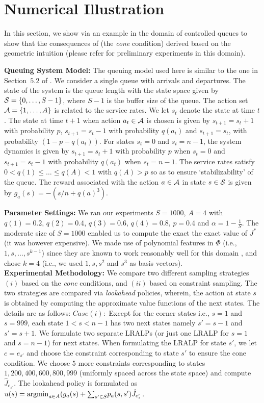 \section{Numerical Illustration}
In this section, we show via an example in the domain of controlled queues to show that the consequences of  (the \emph{cone} condition) derived based on the geometric intuition (please refer \cite{aaaipaper} for preliminary experiments in this domain).

\textbf{Queuing System Model:} The queuing model used here is similar to the one in Section~$5.2$ of \cite{ALP}. We consider a single queue with arrivals and departures. The state of the system is the queue length with the state space given by $\S=\{0,\ldots,S-1\}$, where $S-1$ is the buffer size of the queue. The action set $\A=\{1,\ldots,A\}$ is related to the service rates. We let $s_t$ denote the state at time $t$. The state at time $t+1$ when action $a_t \in \A $ is chosen is given by $s_{t+1}= s_{t}+1$ with probability $p$, $s_{t+1}= s_{t}-1$ with probability $q(a_t)$ and $s_{t+1}= s_t$, with probability $(1-p-q(a_t))$. For states $s_t=0$ and $s_t=n-1$, the system dynamics is given by $s_{t+1}= s_{t}+1$ with probability $p$ when $s_t=0$ and $s_{t+1}=s_t-1$ with probability $q(a_t)$ when $s_t=n-1$. The service rates satisfy $0<q(1)\leq \ldots\leq q(A)<1$ with $q(A)>p$ so as to ensure `stabilizability' of the queue. The reward associated with the action $a \in \A$ in state $s\in \S$ is given by $g_a(s)=-(s/n+q(a)^3)$.\par
\textbf{Parameter Settings:} We ran our experiments $S=1000$, $A=4$ with $q(1)=0.2$, $q(2)=0.4$, $q(3)=0.6$, $q(4)=0.8$, $p=0.4$ and $\alpha=1-\frac{1}{S}$.
The moderate size of $S=1000$ enabled us to compute the exact the exact value of $J^*$ (it was however expensive). We made use of polynomial features in $\Phi$ (i.e., $1,s,\ldots,s^{k-1}$) since they are known to work reasonably well for this domain \cite{ALP}, and chose $k=4$ (i.e., we used $1, s,s^2$ and $s^3$ as basis vectors).\\
\textbf{Experimental Methodology:} We compare two different sampling strategies $(i)$ based on the \emph{cone} conditions, and $(ii)$ based on constraint sampling. The two strategies are compared via  \emph{lookahead} policies, wherein, the action at state $s$ is obtained by computing the approximate value functions of the next states. The details are as follows:
$Case (i):$ Except for the corner states i.e., $s=1$ and $s=999$, each state $1<s<n-1$ has two next states namely $s'=s-1$ and $s'=s+1$. We formulate two separate LRALPs (or just one LRALP for $s=1$ and $s=n-1$) for next states. When formulating the LRALP for state $s'$, we let $c=e_{s'}$ and choose the constraint corresponding to state $s'$ to ensure the cone condition. We choose $5$ more constraints corresponding to states $1,200,400,600,800,999$ (uniformly spaced across the state space) and compute $\hat{J}_{e_{s'}}$. The lookahead policy is formulated as $u(s)={\argmin}_{a\in A}(g_a(s)+{\sum}_{s'\in S}p_a(s,s')\hat{J}_{e_s'}$.\\
